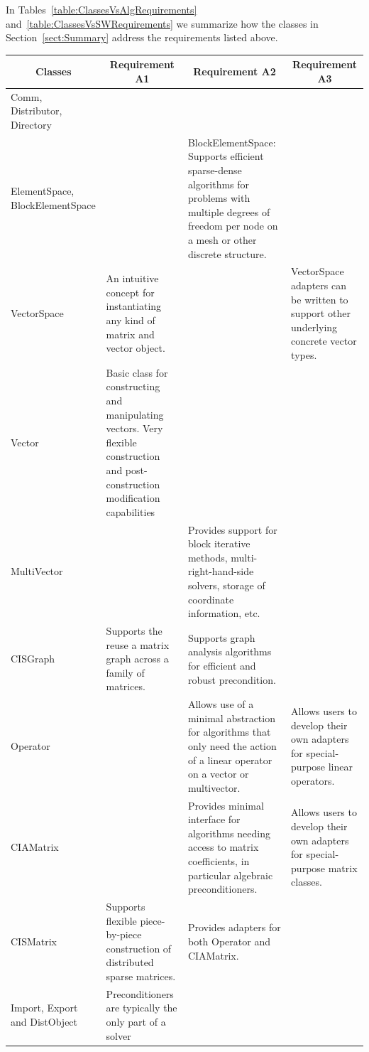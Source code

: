 \documentclass[10pt,relax]{PetraObjectModel}
\begin{document}
In Tables~\ref{table:ClassesVsAlgRequirements}
and~\ref{table:ClassesVsSWRequirements} we summarize how the classes
in Section~\ref{sect:Summary} address the requirements listed above.
\begin{table}
  \centering
  \scriptsize
  \begin{tabular}{|p{0.8in}||p{1.5in}|p{1.5in}|p{1.5in}|}
    \hline
    \multicolumn{1}{|c|}{Classes} & \multicolumn{1}{|c|}{Requirement A1} &
    \multicolumn{1}{|c|}{Requirement A2} & \multicolumn{1}{|c|}{Requirement A3} \\\hline
    Comm, Distributor, Directory & & & \\\hline\hline
    ElementSpace, BlockElementSpace & & BlockElementSpace: Supports
    efficient sparse-dense algorithms for problems with multiple
    degrees of freedom per node on a mesh or other discrete
    structure. & \\\hline
    VectorSpace & An intuitive concept for instantiating any kind of matrix and vector object.& &
    VectorSpace adapters can be written to support other underlying concrete vector types.\\\hline
    Vector & Basic class for constructing and manipulating vectors.
    Very flexible construction and post-construction modification capabilities& & \\\hline
    MultiVector & & Provides support for block iterative methods, multi-right-hand-side
    solvers, storage of coordinate information, etc. & \\\hline
    CISGraph& Supports the reuse a matrix graph across a family of matrices. &
    Supports graph analysis algorithms for efficient and robust precondition. & \\\hline
    Operator & & Allows use of a minimal abstraction for algorithms that only need
    the action of a linear operator on a vector or multivector. &
    Allows users to develop their own adapters for special-purpose linear operators.\\\hline
    CIAMatrix& & Provides minimal interface for algorithms needing access to matrix
    coefficients, in particular algebraic preconditioners. &
    Allows users to develop their own adapters for special-purpose matrix classes. \\\hline
    CISMatrix & Supports flexible piece-by-piece construction of distributed sparse matrices.&
    Provides adapters for both Operator and CIAMatrix. & \\\hline
    Import, Export and DistObject & Preconditioners are typically the only part of a solver

\end{tabular}
\end{table}
\end{document}
